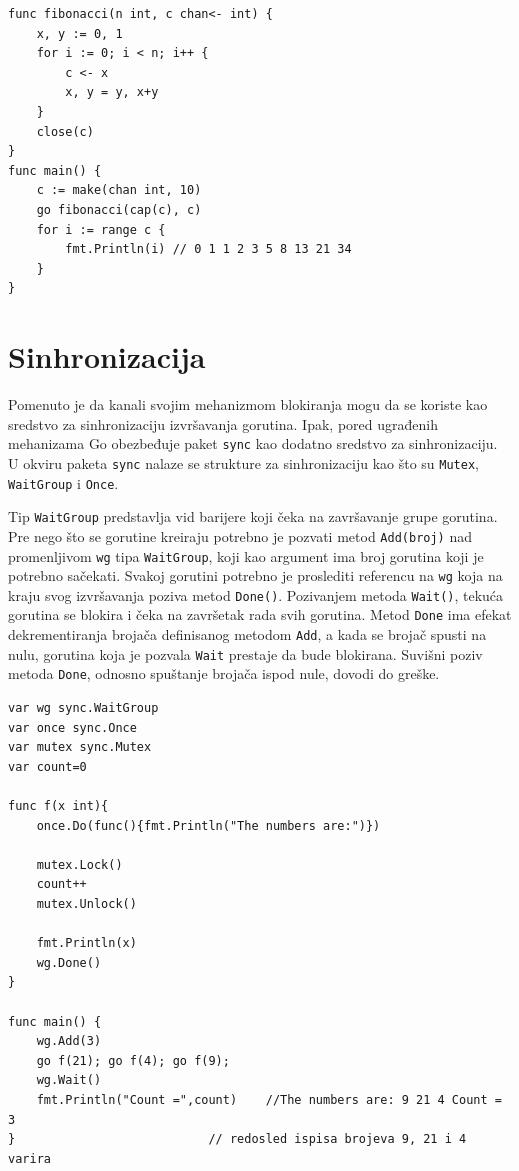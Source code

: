 \documentclass[12pt,oneside]{memoir}
\begin{document}
\begin{center}
\begin{lstlisting}[caption=Upotreba jednosmernog kanala i kanala sa baferom, label={lst:chan2},  backgroundcolor=\color{background}]
func fibonacci(n int, c chan<- int) {
	x, y := 0, 1
	for i := 0; i < n; i++ {
		c <- x
		x, y = y, x+y
	}
	close(c)
}
func main() {
	c := make(chan int, 10)
	go fibonacci(cap(c), c)
	for i := range c {
		fmt.Println(i) // 0 1 1 2 3 5 8 13 21 34
	}
}
\end{lstlisting}
\end{center}

\section{Sinhronizacija}

Pomenuto je da kanali svojim mehanizmom blokiranja mogu da se koriste kao sredstvo za sinhronizaciju izvršavanja gorutina. Ipak, pored ugrađenih mehanizama Go obezbeđuje paket \texttt{sync} kao dodatno sredstvo za sinhronizaciju. U okviru paketa \texttt{sync} nalaze se strukture za sinhronizaciju kao što su \texttt{Mutex}, \texttt{WaitGroup} i \texttt{Once}.

Tip \texttt{WaitGroup} predstavlja vid barijere koji čeka na završavanje grupe gorutina. Pre nego što se gorutine kreiraju potrebno je pozvati metod \texttt{Add(broj)} nad promenljivom \texttt{wg} tipa \texttt{WaitGroup}, koji kao argument ima broj gorutina koji je potrebno sačekati. Svakoj gorutini potrebno je proslediti referencu na \texttt{wg} koja na kraju svog izvršavanja poziva metod \texttt{Done()}. Pozivanjem metoda \texttt{Wait()}, tekuća gorutina se blokira i čeka na završetak rada svih gorutina.  Metod \texttt{Done} ima efekat dekrementiranja brojača definisanog metodom \texttt{Add}, a kada se brojač spusti na nulu, gorutina koja je pozvala \texttt{Wait} prestaje da bude blokirana. Suvišni poziv metoda \texttt{Done}, odnosno spuštanje brojača ispod nule, dovodi do greške. 

\begin{center}
\begin{lstlisting}[caption=Upotreba paketa \texttt{sync} za sinhronizaciju, label={lst:sync},  backgroundcolor=\color{background}]
var wg sync.WaitGroup
var once sync.Once
var mutex sync.Mutex
var count=0

func f(x int){
	once.Do(func(){fmt.Println("The numbers are:")})
	
	mutex.Lock()
	count++
	mutex.Unlock()
	
	fmt.Println(x)
	wg.Done()
}

func main() {
	wg.Add(3)
	go f(21); go f(4); go f(9);	
	wg.Wait()
	fmt.Println("Count =",count)	//The numbers are: 9 21 4 Count = 3 
}							// redosled ispisa brojeva 9, 21 i 4 varira
\end{lstlisting}
\end{center}
\end{document}
